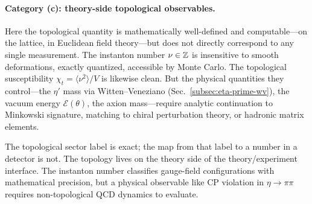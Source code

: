 \paragraph{Category (c): theory-side topological observables.}
Here the topological quantity is mathematically well-defined and computable---on the lattice, in Euclidean field theory---but does not directly correspond to any single measurement. The instanton number $\nu\in\mathbb{Z}$ is insensitive to smooth deformations, exactly quantized, accessible by Monte Carlo. The topological susceptibility $\chi_t = \langle\nu^2\rangle/V$ is likewise clean. But the physical quantities they control---the $\eta'$ mass via Witten--Veneziano (Sec.~\ref{subsec:eta-prime-wv}), the vacuum energy $\mathcal{E}(\theta)$, the axion mass---require analytic continuation to Minkowski signature, matching to chiral perturbation theory, or hadronic matrix elements.

The topological sector label is exact; the map from that label to a number in a detector is not. The topology lives on the theory side of the theory/experiment interface. The instanton number classifies gauge-field configurations with mathematical precision, but a physical observable like CP violation in $\eta\to\pi\pi$ requires non-topological QCD dynamics to evaluate.

